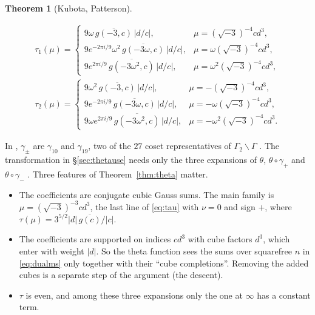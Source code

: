 \documentclass[11pt]{article}
\numberwithin{equation}{section}
\newtheorem{theorem}{Theorem}
\theoremstyle{definition}
\theoremstyle{remark}
\begin{document}
\begin{theorem}[Kubota, Patterson]
\begin{enumerate}
\begin{gather}
 \tau_1(\mu)=\begin{cases}
 9\omega\,\overline{g(-3,c)}\,|d/c|,&\mu=(\sqrt{-3})^{-4}cd^3,\\
 9e^{-2\pi i/9}\omega^2\,\overline{g(-3\omega,c)}\,|d/c|,&\mu=\omega(\sqrt{-3})^{-4}cd^3,\\
 9e^{2\pi i/9}\,\overline{g(-3\omega^2,c)}\,|d/c|,&\mu=\omega^2(\sqrt{-3})^{-4}cd^3,
 \end{cases}\label{eq:tau1}\\
 \tau_2(\mu)=\begin{cases}
 9\omega^2\,\overline{g(-3,c)}\,|d/c|,&\mu=-(\sqrt{-3})^{-4}cd^3,\\
 9e^{-2\pi i/9}\,\overline{g(-3\omega,c)}\,|d/c|,&\mu=-\omega(\sqrt{-3})^{-4}cd^3,\\
 9\omega e^{2\pi i/9}\,\overline{g(-3\omega^2,c)}\,|d/c|,&\mu=-\omega^2(\sqrt{-3})^{-4}cd^3.
 \end{cases}\label{eq:tau2}
\end{gather}
\end{enumerate}
\end{theorem}

In \cite{DR}, $\gamma_\pm$ are $\gamma_{10}$ and $\gamma_{19}$, two of the $27$ coset representatives of $\Gamma_2\backslash\Gamma$
\cite[Table~II]{Pat77}. The transformation in \S\ref{sec:thetause} needs only the three expansions of $\theta$,
$\theta\circ\gamma_+$ and $\theta\circ\gamma_-$ \cite[App.~A.2]{QRH}. Three features of Theorem~\ref{thm:theta} matter.
\begin{itemize}
\item The coefficients are conjugate cubic Gauss sums. The main family is $\mu=(\sqrt{-3})^{-3}cd^3$, the last line of
\eqref{eq:tau} with $\nu=0$ and sign $+$, where $\tau(\mu)=3^{5/2}|d|\,\overline{g(c)}/|c|$.
\item The coefficients are supported on indices $cd^3$ with cube factors $d^3$, which enter with weight
$|d|$. So the theta function sees the sums over squarefree $n$ in \eqref{eq:dualms} only together with their
``cube completions''. Removing the added cubes is a separate step of the argument (the descent).
\item $\tau$ is even, and among these three expansions only the one at $\infty$ has a constant term.
\end{itemize}
\end{document}

